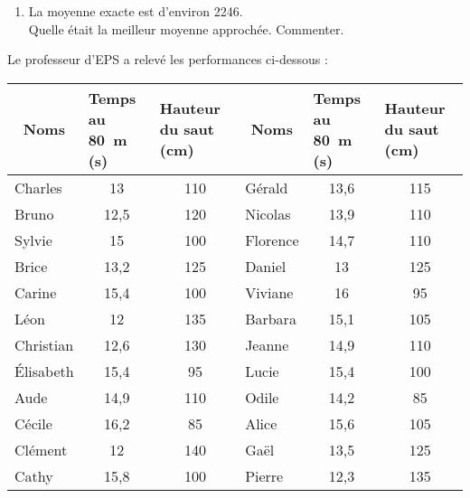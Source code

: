 \documentclass[10pt]{article}
\begin{document}
{\begin{Exo}
\begin{enumerate}
\item La moyenne exacte est d'environ 2246.\\
Quelle était la meilleur moyenne approchée. Commenter.%
\end{enumerate}
\end{Exo}

\begin{Exo}
Le professeur d'EPS a relevé les performances ci-dessous :
\begin{center}
  \begin{tabularx}{0.85\linewidth}{|l|X|X|l|X|X|}
    \hline
\multicolumn{1}{|c|}{Noms}&Temps au 80~m (s)&Hauteur du saut (cm)&\multicolumn{1}{c|}{Noms}&Temps au 80~m (s)&Hauteur du saut (cm)\\
\hline
Charles&\multicolumn{1}{c|}{13}&\multicolumn{1}{c|}{110}&Gérald&\multicolumn{1}{c|}{13,6}&\multicolumn{1}{c|}{115}\\
Bruno&\multicolumn{1}{c|}{12,5}&\multicolumn{1}{c|}{120}&Nicolas&\multicolumn{1}{c|}{13,9}&\multicolumn{1}{c|}{110}\\
Sylvie&\multicolumn{1}{c|}{15}&\multicolumn{1}{c|}{100}&Florence&\multicolumn{1}{c|}{14,7}&\multicolumn{1}{c|}{110}\\
Brice&\multicolumn{1}{c|}{13,2}&\multicolumn{1}{c|}{125}&Daniel&\multicolumn{1}{c|}{13}&\multicolumn{1}{c|}{125}\\
Carine&\multicolumn{1}{c|}{15,4}&\multicolumn{1}{c|}{100}&Viviane&\multicolumn{1}{c|}{16}&\multicolumn{1}{c|}{95}\\
Léon&\multicolumn{1}{c|}{12}&\multicolumn{1}{c|}{135}&Barbara&\multicolumn{1}{c|}{15,1}&\multicolumn{1}{c|}{105}\\
Christian&\multicolumn{1}{c|}{12,6}&\multicolumn{1}{c|}{130}&Jeanne&\multicolumn{1}{c|}{14,9}&\multicolumn{1}{c|}{110}\\
\'Elisabeth&\multicolumn{1}{c|}{15,4}&\multicolumn{1}{c|}{95}&Lucie&\multicolumn{1}{c|}{15,4}&\multicolumn{1}{c|}{100}\\
Aude&\multicolumn{1}{c|}{14,9}&\multicolumn{1}{c|}{110}&Odile&\multicolumn{1}{c|}{14,2}&\multicolumn{1}{c|}{85}\\
Cécile&\multicolumn{1}{c|}{16,2}&\multicolumn{1}{c|}{85}&Alice&\multicolumn{1}{c|}{15,6}&\multicolumn{1}{c|}{105}\\
Clément&\multicolumn{1}{c|}{12}&\multicolumn{1}{c|}{140}&Gaël&\multicolumn{1}{c|}{13,5}&\multicolumn{1}{c|}{125}\\
Cathy&\multicolumn{1}{c|}{15,8}&\multicolumn{1}{c|}{100}&Pierre&\multicolumn{1}{c|}{12,3}&\multicolumn{1}{c|}{135}\\

\end{tabularx}
\end{center}
\end{Exo}}
\end{document}

